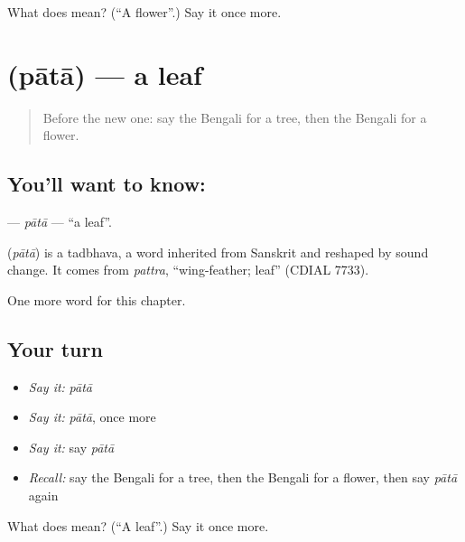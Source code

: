 \begin{tcolorbox}[breakable,colback=teal!4,colframe=teal!35!black,title={Before you move on}]
What does  mean? (\textquotedblleft{}A flower\textquotedblright{}.) Say it once more.
\end{tcolorbox}
\section[\texorpdfstring{\bn{পাতা} (pātā)}{পাতা (pātā)}]{ (pātā) — a leaf}

\label{lesson:BN-C65-pata}



\begin{quote}
Before the new one: say the Bengali for a tree, then the Bengali for a flower.
\end{quote}

\subsection*{You'll want to know: }
\textbf{} — \emph{pātā} — \textquotedblleft{}a leaf\textquotedblright{}.

\begin{cousinweb}
\textbf{} (\emph{pātā}) is a tadbhava, a word inherited from Sanskrit and reshaped by sound change. It comes from \emph{pattra}, \textquotedblleft{}wing-feather; leaf\textquotedblright{} (CDIAL 7733).
\end{cousinweb}

\begin{grammarlens}[title={What you've built}]
One more word for this chapter.
\end{grammarlens}

\subsection*{Your turn}
\begin{itemize}
\raggedright
  \item \emph{Say it:} \emph{pātā}
  \item \emph{Say it:} \emph{pātā}, once more
  \item \emph{Say it:} say \emph{pātā}
  \item \emph{Recall:} say the Bengali for a tree, then the Bengali for a flower, then say \emph{pātā} again
\end{itemize}

\begin{tcolorbox}[breakable,colback=teal!4,colframe=teal!35!black,title={Before you move on}]
What does  mean? (\textquotedblleft{}A leaf\textquotedblright{}.) Say it once more.
\end{tcolorbox}
